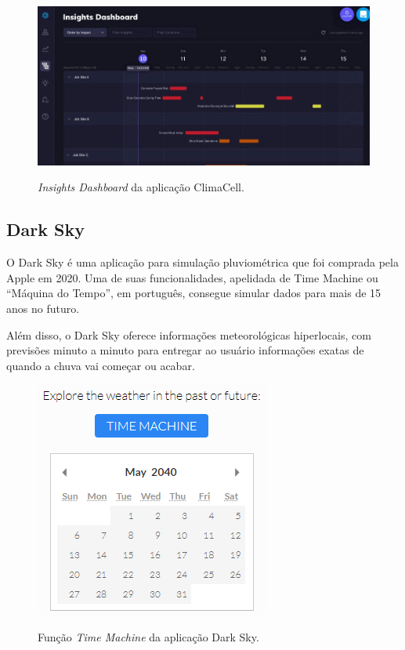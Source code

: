 \begin{figure}[H]
	\caption{\small \emph{Insights Dashboard} da aplicação ClimaCell.}
	\centering
	\includegraphics[width=\textwidth]{figs/climacell.jpg}
	\label{f.darksky-calendar}
\end{figure}

\subsection{Dark Sky}
\label{ss.darksky}
O Dark Sky é uma aplicação para simulação pluviométrica que foi comprada pela Apple em 2020. Uma de suas funcionalidades, apelidada de Time Machine ou “Máquina do Tempo”, em português, consegue simular dados para mais de 15 anos no futuro.

Além disso, o Dark Sky oferece informações meteorológicas hiperlocais, com previsões minuto a minuto para entregar ao usuário informações exatas de quando a chuva vai começar ou acabar.

\begin{figure}[H]
	\caption{\small Função \emph{Time Machine} da aplicação Dark Sky.}
	\centering
	\includegraphics[scale=0.75]{figs/darkskyCalendar.PNG}
	\label{f.darksky-calendar}
\end{figure}

